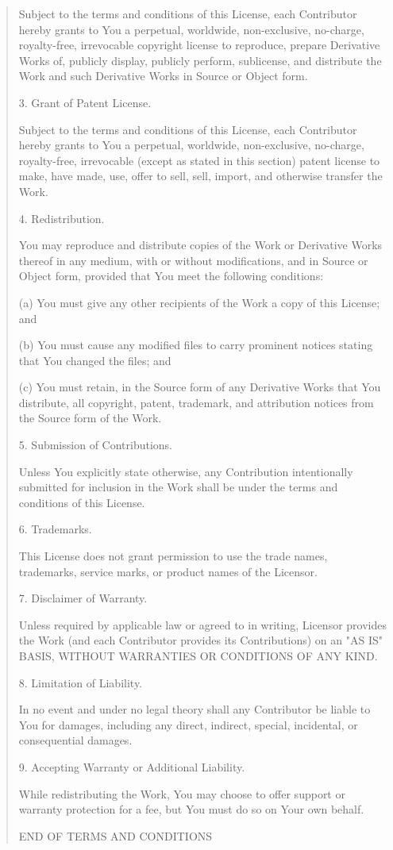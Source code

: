 \documentclass[12pt,a4paper]{article}
\theoremstyle{definition}
\theoremstyle{remark}
\begin{document}
\begin{quote}
Subject to the terms and conditions of this License, each Contributor
hereby grants to You a perpetual, worldwide, non-exclusive, no-charge,
royalty-free, irrevocable copyright license to reproduce, prepare
Derivative Works of, publicly display, publicly perform, sublicense,
and distribute the Work and such Derivative Works in Source or Object
form.

3. Grant of Patent License.

Subject to the terms and conditions of this License, each Contributor
hereby grants to You a perpetual, worldwide, non-exclusive, no-charge,
royalty-free, irrevocable (except as stated in this section) patent
license to make, have made, use, offer to sell, sell, import, and
otherwise transfer the Work.

4. Redistribution.

You may reproduce and distribute copies of the Work or Derivative
Works thereof in any medium, with or without modifications, and in
Source or Object form, provided that You meet the following conditions:

(a) You must give any other recipients of the Work a copy of this
    License; and

(b) You must cause any modified files to carry prominent notices
    stating that You changed the files; and

(c) You must retain, in the Source form of any Derivative Works that
    You distribute, all copyright, patent, trademark, and attribution
    notices from the Source form of the Work.

5. Submission of Contributions.

Unless You explicitly state otherwise, any Contribution intentionally
submitted for inclusion in the Work shall be under the terms and
conditions of this License.

6. Trademarks.

This License does not grant permission to use the trade names,
trademarks, service marks, or product names of the Licensor.

7. Disclaimer of Warranty.

Unless required by applicable law or agreed to in writing, Licensor
provides the Work (and each Contributor provides its Contributions)
on an "AS IS" BASIS, WITHOUT WARRANTIES OR CONDITIONS OF ANY KIND.

8. Limitation of Liability.

In no event and under no legal theory shall any Contributor be liable
to You for damages, including any direct, indirect, special,
incidental, or consequential damages.

9. Accepting Warranty or Additional Liability.

While redistributing the Work, You may choose to offer support or
warranty protection for a fee, but You must do so on Your own behalf.

END OF TERMS AND CONDITIONS
\end{quote}
\end{document}
